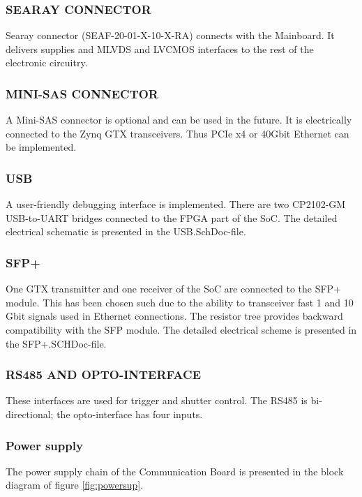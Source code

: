 \subsubsection{SEARAY CONNECTOR}
Searay connector (SEAF-20-01-X-10-X-RA) connects with the Mainboard. It delivers supplies and MLVDS and LVCMOS interfaces to the rest of the electronic circuitry.

\subsubsection{MINI-SAS CONNECTOR}
A Mini-SAS connector is optional and can be used in the future. It is electrically connected to the Zynq GTX transceivers. Thus PCIe x4 or 40Gbit Ethernet can be implemented.
\subsubsection{USB}
A user-friendly debugging interface is implemented. There are two CP2102-GM USB-to-UART bridges connected to the FPGA part of the SoC.
The detailed electrical schematic is presented in the USB.SchDoc-file.

\subsubsection{SFP+}
One GTX transmitter and one receiver of the SoC are connected to the SFP+ module. This has been chosen such due to the ability to transceiver fast 1 and 10 Gbit signals used in Ethernet connections. The resistor tree provides backward compatibility with the SFP module.
The detailed electrical scheme is presented in the SFP+.SCHDoc-file.

\subsubsection{RS485 AND OPTO-INTERFACE}
These interfaces are used for trigger and shutter control. The RS485 is bi-directional; the opto-interface has four inputs.

\subsubsection{Power supply}
The power supply chain of the Communication Board is presented in the block diagram of figure \ref{fig:powersup}.

